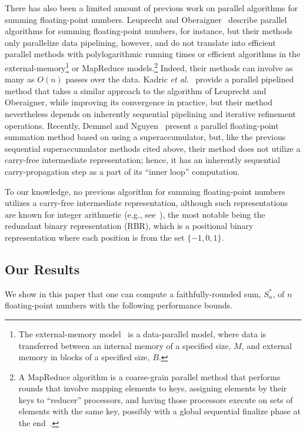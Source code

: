 \documentclass[11pt]{article}
\begin{document}
\sloppy
There has also been a limited amount of
previous work on parallel algorithms for summing floating-point numbers.
Leuprecht and Oberaigner~\cite{par82}
describe parallel algorithms for summing
floating-point numbers, for instance, but
their methods only parallelize data pipelining, however, and
do not translate into efficient parallel methods with polylogarithmic 
running times or efficient algorithms in the 
external-memory\footnote{The external-memory model~\cite{Vitter:2008} 
 is a data-parallel model, where data is transferred between an internal
 memory of a specified size, $M$, and external memory in blocks of a 
 specified size, $B$.}
or 
MapReduce models.\footnote{A MapReduce algorithm is a coarse-grain
  parallel method that performs rounds that involve mapping elements to 
  keys, assigning elements by their keys to ``reducer'' processors,
  and having those processors execute on sets of elements with 
  the same key, possibly with a global sequential finalize 
  phase at the end~\cite{Dean:2008,mapsort,Karloff:2010}.}
Indeed, their methods can involve as many as $O(n)$ passes over the data.
Kadric {\it et al.}~\cite{KGD6545903} provide a parallel pipelined method 
that takes a similar approach to the algorithm of Leuprecht and Oberaigner,
while improving its convergence in practice, but 
their method nevertheless depends on
inherently sequential pipelining and iterative refinement operations.
Recently,
Demmel and Nguyen~\cite{DN6875899} present a parallel floating-point summation
method based on using a superaccumulator, 
but, like the previous sequential superaccumulator methods
cited above, their method does not
utilize a carry-free intermediate representation; hence, it has an inherently
sequential carry-propagation step as a part of its ``inner loop'' computation.

\fussy

To our knowledge, no previous algorithm for summing
floating-point numbers utilizes a carry-free intermediate representation,
although such representations are known 
for integer arithmetic (e.g., see~\cite{P46283}),
the most notable being the redundant binary representation (RBR), 
which is a positional binary representation where each position is from
the set $\{-1,0,1\}$.

\subsection{Our Results}

We show in this paper that
one can compute a faithfully-rounded sum, $S_n^*$, of $n$ 
floating-point numbers with the following performance bounds.
\end{document}
